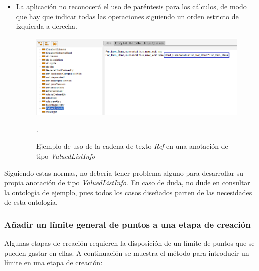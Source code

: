 \begin{itemize}
    \item La aplicación no reconocerá el uso de paréntesis para los cálculos, de modo que hay que indicar todas las operaciones siguiendo 
    un orden estricto de izquierda a derecha.

    \begin{figure}[H]
        \centering
        \includegraphics[scale=0.6]{Figures/Protege/Ref_example.png}
        \caption{Ejemplo de uso de la cadena de texto \textit{Ref} en una anotación de tipo \textit{ValuedListInfo}}.
        \label{Ref_example}
    \end{figure}
\end{itemize}

Siguiendo estas normas, no debería tener problema alguno para desarrollar su propia anotación de tipo \textit{ValuedListInfo}.
En caso de duda, no dude en consultar la ontología de ejemplo, pues todos los casos diseñados parten de las necesidades de 
esta ontología.

\subsubsection{Añadir un límite general de puntos a una etapa de creación}\label{GeneralLimit}
Algunas etapas de creación requieren la disposición de un límite de puntos que se pueden gastar en ellas. A continuación
se muestra el método para introducir un límite en una etapa de creación:

